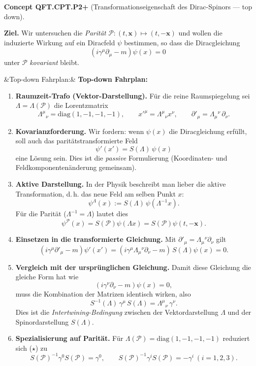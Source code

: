 \documentclass[10pt, letterpaper]{article}
\newenvironment{romanenum}[1][]
  {%
    \ifx&#1&
    \else
      \textbf{#1}\quad
    \fi
    \begin{enumerate}[label=\roman*)]
  }
  {%
    \end{enumerate}%
  }
\newcommand{\CustomHeading}[3]{%
  \par\medskip\noindent%
  \textbf{#1 #2} \textnormal{(#3)}.\enskip%
}
\newenvironment{CONC}[2]{\begin{unitbox}\CustomHeading{Concept}{#1}{#2}}{\end{unitbox}}
\begin{document}
\begin{CONC}{QFT.CPT.P2+}{Transformationseigenschaft des Dirac-Spinors — top down}

\textbf{Ziel.} Wir untersuchen die \emph{Parität} $\mathcal P:(t,\mathbf x)\mapsto (t,-\mathbf x)$ und wollen die induzierte Wirkung auf ein Diracfeld $\psi$ bestimmen, so dass die Diracgleichung
\[
(i\gamma^\mu\partial_\mu-m)\psi(x)=0
\]
unter $\mathcal P$ \emph{kovariant} bleibt.

\begin{romanenum}[Top-down Fahrplan:]
\item \textbf{Raumzeit-Trafo (Vektor-Darstellung).}
Für die reine Raumspiegelung sei $\Lambda=\Lambda(\mathcal P)$ die Lorentzmatrix
\[
\Lambda^\mu{}_\nu=\mathrm{diag}(1,-1,-1,-1),\qquad
x'^\mu=\Lambda^\mu{}_\nu x^\nu,\qquad
\partial'_\mu=\Lambda_\mu{}^\nu\,\partial_\nu .
\]

\item \textbf{Kovarianzforderung.}
Wir fordern: wenn $\psi(x)$ die Diracgleichung erfüllt, soll auch das paritätstransformierte Feld
\[
\psi'(x') = S(\Lambda)\,\psi(x)
\tag{3}
\]
eine Lösung sein.  Dies ist die \emph{passive} Formulierung (Koordinaten- und Feldkomponenten­änderung gemeinsam).

\item \textbf{Aktive Darstellung.}
In der Physik beschreibt man lieber die aktive Transformation, d.\,h. das neue Feld am selben Punkt $x$:
\[
\psi^{\Lambda}(x) := S(\Lambda)\,\psi(\Lambda^{-1}x).
\tag{3'}
\]
Für die Parität ($\Lambda^{-1}=\Lambda$) lautet dies
\[
\psi^{\mathcal P}(x)=S(\mathcal P)\psi(\Lambda x)=S(\mathcal P)\psi(t,-\mathbf x).
\]

\item \textbf{Einsetzen in die transformierte Gleichung.}
Mit $\partial'_\mu=\Lambda_\mu{}^\nu\partial_\nu$ gilt
\[
(i\gamma^\mu\partial'_\mu - m)\psi'(x')
= (i\gamma^\mu \Lambda_\mu{}^\nu \partial_\nu - m)\,S(\Lambda)\psi(x) = 0.
\tag{4}
\]

\item \textbf{Vergleich mit der ursprünglichen Gleichung.}
Damit diese Gleichung die gleiche Form hat wie
\[
(i\gamma^\nu \partial_\nu - m)\psi(x)=0,
\tag{5}
\]
muss die Kombination der Matrizen identisch wirken, also
\[
S^{-1}(\Lambda)\,\gamma^\mu\,S(\Lambda)=\Lambda^\mu{}_\nu\,\gamma^\nu.
\tag{$\star$}
\]
Dies ist die \emph{Intertwining-Bedingung} zwischen der Vektordarstellung $\Lambda$ und der Spinordarstellung $S(\Lambda)$.

\item \textbf{Spezialisierung auf Parität.}
Für $\Lambda(\mathcal P)=\mathrm{diag}(1,-1,-1,-1)$ reduziert sich ($\star$) zu
\[
S(\mathcal P)^{-1}\gamma^0 S(\mathcal P)=\gamma^0,\qquad
S(\mathcal P)^{-1}\gamma^i S(\mathcal P)=-\gamma^i\ (i=1,2,3).
\tag{$\star\star$}
\]


\end{romanenum}
\end{CONC}
\end{document}
